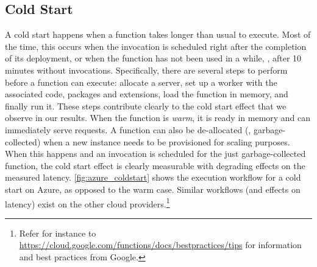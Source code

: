 
\subsection{Cold Start}
\label{sec:coldstart}

A cold start happens when a function takes longer than usual to execute. 
Most of the time, this occurs when the invocation is scheduled right after the completion of its deployment, or when the function has not been used in a while, \eg, after 10 minutes without invocations.
Specifically, there are several steps to perform before a function can execute: allocate a server, set up a worker with the associated code, packages and extensions, load the function in memory, and finally run it.
These steps contribute clearly to the cold start effect that we observe in our results.
When the function is \emph{warm}, it is ready in memory and can immediately serve requests.
A function can also be de-allocated (\ie, garbage-collected) when a new instance needs to be provisioned for scaling purposes. 
When this happens and an invocation is scheduled for the just garbage-collected function, the cold start effect is clearly measurable with degrading effects on the measured latency.
\autoref{fig:azure_coldstart} shows the execution workflow for a cold start on Azure, as opposed to the warm case. 
Similar workflows (and effects on latency) exist on the other cloud providers.\footnote{Refer for instance to \url{https://cloud.google.com/functions/docs/bestpractices/tips} for information and best practices from Google.}

